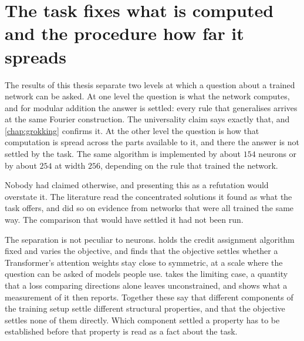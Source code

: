 %
%
%

\section{The task fixes what is computed and the procedure how far it spreads}
\label{sec:disc_levels}

The results of this thesis separate two levels at which a question about a
trained network can be asked. At one level the question is what the network
computes, and for modular addition the answer is settled: every rule that
generalises arrives at the same Fourier construction. The universality claim says exactly that, and \cref{chap:grokking} confirms it. At the other level the question is how that computation is
spread across the parts available to it, and there the answer is not settled by the
task. The same algorithm is implemented by about $154$ neurons or by about
$254$ at width $256$, depending on the rule that trained the network.

Nobody had claimed otherwise, and presenting this as a refutation would
overstate it. The literature read the concentrated solutions it found as what
the task offers, and did so on evidence from networks that were all trained
the same way. The comparison that would have settled it had not been run.

The separation is not peculiar to neurons.  holds the
credit assignment algorithm fixed and varies the objective, and finds that the
objective settles whether a Transformer's attention weights stay close to
symmetric, at a scale where the question can be asked of models people use.
 takes the limiting case, a quantity that a loss comparing
directions alone leaves unconstrained, and shows what a measurement of it then
reports. Together these say that different components of the
training setup settle different structural properties, and that the objective
settles none of them directly. Which component settled a property has to be
established before that property is read as a fact about the task.

